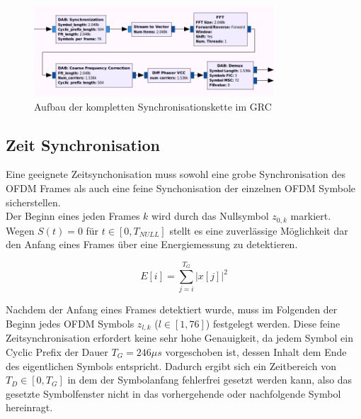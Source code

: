 \begin{figure}[h]
\centering
  \includegraphics[width=0.8\textwidth]{figures/sync_hier_block.png}
	\caption{Aufbau der kompletten Synchronisationskette im \ac{GRC}}
	\label{fig:sync_overview}
\end{figure}

\subsection{Zeit Synchronisation}
\label{sec:time_sync}
Eine geeignete Zeitsynchonisation muss sowohl eine grobe Synchronisation des OFDM Frames als auch eine feine Synchonisation der einzelnen OFDM Symbole sicherstellen. \\

Der Beginn eines jeden Frames $ k $ wird durch das Nullsymbol $z_{0,k}$ markiert. Wegen $S(t) = 0$ für $t \in [0, T_{NULL}]$ stellt es eine zuverlässige Möglichkeit dar den Anfang eines Frames über eine Energiemessung zu detektieren.

\begin{equation}
E[i] = \sum \limits_{j=i}^{T_G}|x[j]|^2
\label{eq:energy}
\end{equation}

Nachdem der Anfang eines Frames detektiert wurde, muss im Folgenden der Beginn jedes OFDM Symbols $z_{l,k}$ ($l \in [1, 76]$) festgelegt werden. Diese feine Zeitsynchronisation erfordert keine sehr hohe Genauigkeit, da jedem Symbol ein Cyclic Prefix der Dauer $T_G = 246 \mu s $ vorgeschoben ist, dessen Inhalt dem Ende des eigentlichen Symbols entspricht. Dadurch ergibt sich ein Zeitbereich von  $T_D \in [0,T_G]$ in dem der Symbolanfang fehlerfrei gesetzt werden kann, also das gesetzte Symbolfenster nicht in das vorhergehende oder nachfolgende Symbol hereinragt.

